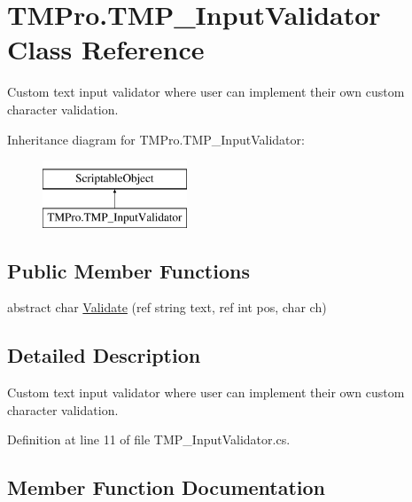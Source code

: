 \hypertarget{class_t_m_pro_1_1_t_m_p___input_validator}{}\section{T\+M\+Pro.\+T\+M\+P\+\_\+\+Input\+Validator Class Reference}
\label{class_t_m_pro_1_1_t_m_p___input_validator}


Custom text input validator where user can implement their own custom character validation.  


Inheritance diagram for T\+M\+Pro.\+T\+M\+P\+\_\+\+Input\+Validator\+:\begin{figure}[H]
\begin{center}
\leavevmode
\includegraphics[height=2.000000cm]{class_t_m_pro_1_1_t_m_p___input_validator}
\end{center}
\end{figure}
\subsection*{Public Member Functions}
\begin{DoxyCompactItemize}
\item 
abstract char \mbox{\hyperlink{class_t_m_pro_1_1_t_m_p___input_validator_acb188d784d649daf3a0fac22d2c56738}{Validate}} (ref string text, ref int pos, char ch)
\end{DoxyCompactItemize}


\subsection{Detailed Description}
Custom text input validator where user can implement their own custom character validation. 



Definition at line 11 of file T\+M\+P\+\_\+\+Input\+Validator.\+cs.



\subsection{Member Function Documentation}
\mbox{\label{class_t_m_pro_1_1_t_m_p___input_validator_acb188d784d649daf3a0fac22d2c56738}} 
